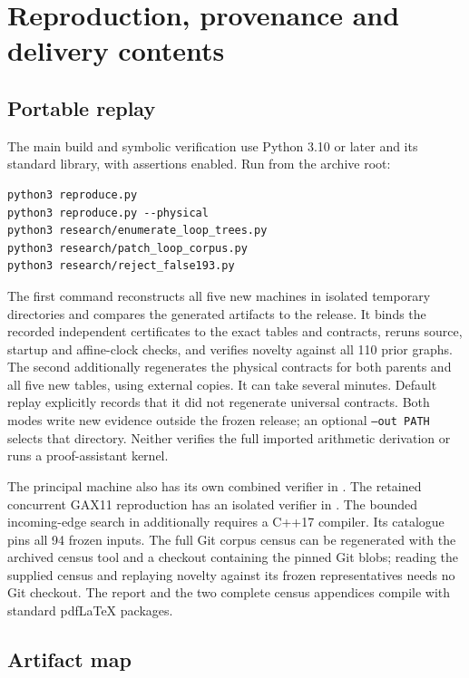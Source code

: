 \documentclass[11pt,a4paper]{article}
\begin{document}


\section{Reproduction, provenance and delivery contents}

\subsection{Portable replay}

The main build and symbolic verification use Python 3.10 or later and
its standard library, with assertions enabled. Run from the archive root:
\begin{lstlisting}
python3 reproduce.py
python3 reproduce.py --physical
python3 research/enumerate_loop_trees.py
python3 research/patch_loop_corpus.py
python3 research/reject_false193.py
\end{lstlisting}
The first command reconstructs all five new machines in isolated
temporary directories and compares the generated artifacts to the release.
It binds the recorded independent certificates to the exact tables and
contracts, reruns source, startup and affine-clock checks, and verifies
novelty against all 110 prior graphs. The second additionally regenerates
the physical contracts for both parents and all five new tables, using
external copies. It can take several minutes. Default replay explicitly
records that it did not regenerate universal contracts. Both modes write
new evidence outside the frozen release; an optional \texttt{--out PATH}
selects that directory. Neither verifies the full imported arithmetic
derivation or runs a proof-assistant kernel.

The principal machine also has its own combined verifier in
. The retained concurrent
GAX11 reproduction has an isolated verifier in
. The bounded incoming-edge
search in  additionally requires a
C++17 compiler. Its catalogue pins all 94 frozen inputs. The full Git
corpus census can be regenerated with the archived census tool and a
checkout containing the pinned Git blobs; reading the supplied census
and replaying novelty against its frozen representatives needs no Git
checkout. The report and the two complete census appendices compile
with standard pdfLaTeX packages.

\subsection{Artifact map}
\end{document}
